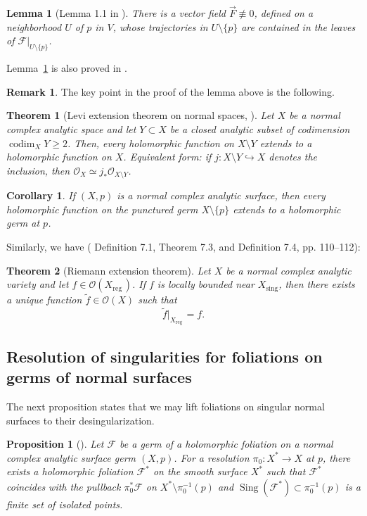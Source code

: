 \documentclass[11pt,twoside]{amsart}
\newcommand{\reg}{\mathrm{reg}\,}
\newcommand{\OO}{\mathcal O}
\newcommand{\F}{\mathcal F}
\DeclareMathOperator{\Sing}{Sing}
\DeclareMathOperator{\codim}{codim}
\DeclareMathOperator{\sing}{sing}
\newtheorem{lema}{Lemma}
\newtheorem{cor}{Corollary}
\newtheorem{teo}{Theorem}
\newtheorem{propo}{Proposition}
\theoremstyle{definition}
\newtheorem{remark}{Remark}
\begin{document}
\begin{lema}[Lemma 1.1 in \cite{Camacho1988}]
\label{lemma:camachovector}\normalfont
There is a vector field $\vec F\not\equiv0$, defined on a neighborhood $U$
of $p$ in $V$, whose trajectories in $U\setminus\{p\}$ are contained in
the leaves of $\F|_{U\setminus\{p\}}$.
\end{lema}
Lemma~\ref{lemma:camachovector} is also proved in \cite{GomezMont}.
\begin{remark}
The key point in the proof of the lemma above is the following.
\end{remark}

\begin{teo}[Levi extension theorem on normal spaces, \cite{GunningRossi1965}]\normalfont
Let $X$ be a normal complex analytic space and let $Y\subset X$ be a closed analytic subset of codimension $\codim_XY\geq2$. Then, every holomorphic function on $X\setminus Y$ extends to a holomorphic function on $X$. Equivalent form: if $j\colon X\setminus Y\hookrightarrow X$
denotes the inclusion, then $\OO_X\simeq j_*\OO_{X\setminus Y}$.
\end{teo}

\begin{cor}\normalfont
If $(X,p)$ is a normal complex analytic surface, then every holomorphic function on the punctured germ $X\setminus\{p\}$ extends to a holomorphic germ at $p$.
\end{cor}

Similarly, we have (\cite{Demailly} Definition 7.1, Theorem 7.3, and Definition 7.4, pp. 110–112):


\begin{teo}[Riemann extension theorem]
\label{theorem:riemmanextension}
\normalfont
Let $X$ be a normal complex analytic variety and let
$f\in\mathcal O(X_{\reg})$. If $f$ is locally bounded near
$X_{\sing}$, then there exists a unique function
$\widetilde f\in\mathcal O(X)$ such that
\[
\widetilde f|_{X_{\reg}}=f.
\]
\end{teo}

\subsection{Resolution of singularities for foliations on germs of normal surfaces}
The next proposition states that we may lift foliations on singular normal surfaces to
their desingularization.
\begin{propo}[\cite{Camacho1988}]\normalfont
Let $\F$ be a germ of a holomorphic foliation on a normal complex analytic
surface germ $(X,p)$. For a resolution $\pi_0\colon X^*\to X$ at $p$,
there exists a holomorphic foliation $\F^*$ on the smooth surface $X^*$
such that $\F^*$ coincides with the pullback $\pi_0^*\F$ on
$X^*\setminus\pi_0^{-1}(p)$ and
$\Sing(\F^*)\subset\pi_0^{-1}(p)$
is a finite set of isolated points.
\end{propo}
\end{document}
